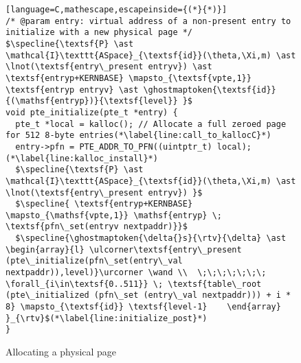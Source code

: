 \begin{figure}\footnotesize
  \begin{lstlisting}[language=C,mathescape,escapeinside={(*}{*)}]
/* @param entry: virtual address of a non-present entry to initialize with a new physical page */
$\specline{\textsf{P} \ast \mathcal{I}\texttt{ASpace}_{\textsf{id}}(\theta,\Xi,m) \ast \lnot(\textsf{entry\_present entryv}) \ast \textsf{entryp+KERNBASE} \mapsto_{\textsf{vpte,1}} \textsf{entryp entryv} \ast \ghostmaptoken{\textsf{id}}{(\mathsf{entryp})}{\textsf{level}} }$
void pte_initialize(pte_t *entry) {
  pte_t *local = kalloc(); // Allocate a full zeroed page for 512 8-byte entries(*\label{line:call_to_kallocC}*)
  entry->pfn = PTE_ADDR_TO_PFN((uintptr_t) local);(*\label{line:kalloc_install}*)
  $\specline{\textsf{P} \ast \mathcal{I}\texttt{ASpace}_{\textsf{id}}(\theta,\Xi,m) \ast \lnot(\textsf{entry\_present entryv}) }$
  $\specline{ \textsf{entryp+KERNBASE} \mapsto_{\mathsf{vpte,1}} \mathsf{entryp} \; \textsf{pfn\_set(entryv nextpaddr)}}$
  $\specline{\ghostmaptoken{\delta{}s}{\rtv}{\delta} \ast \begin{array}{l} \ulcorner\textsf{entry\_present (pte\_initialize(pfn\_set(entry\_val nextpaddr)),level)}\urcorner \wand \\  \;\;\;\;\;\;\; \forall_{i\in\textsf{0..511}} \; \textsf{table\_root (pte\_initialized (pfn\_set (entry\_val nextpaddr))) + i * 8} \mapsto_{\textsf{id}} \textsf{level-1}    \end{array}  }_{\rtv}$(*\label{line:initialize_post}*)
}
\end{lstlisting}
\vspace{-2em}
\caption{Allocating a physical page }
\label{pteinitializespecC}
\vspace{-1em}
\end{figure}

